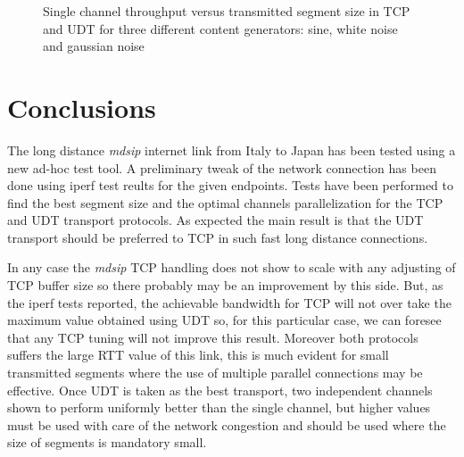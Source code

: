 \documentclass[10pt,a4paper]{article}
\begin{document}
\begin{figure}[ht]
\centerline{
}
\caption[]
{ Single channel throughput versus transmitted segment size in TCP and UDT for three different content generators: sine, white noise and gaussian noise }
\label{fig:content}
\end{figure}



\section{Conclusions}

The long distance \emph{mdsip} internet link from Italy to Japan has been tested using a new ad-hoc test tool.
A preliminary tweak of the network connection has been done using iperf test reults for the given endpoints.
Tests have been performed to find the best segment size and the optimal channels parallelization for the TCP and UDT transport protocols.
As expected the main result is that the UDT transport should be preferred to TCP in such fast long distance connections.

In any case the \emph{mdsip} TCP handling does not show to scale with any adjusting of TCP buffer size so there probably may be an improvement by this side.
But, as the iperf tests reported, the achievable bandwidth for TCP will not over take the maximum value obtained using UDT so, for this particular case, we can foresee that any TCP tuning will not improve this result.
Moreover both protocols suffers the large RTT value of this link, this is much evident for small transmitted segments where the use of multiple parallel connections may be effective.
Once UDT is taken as the best transport, two independent channels shown to perform uniformly better than the single channel, but higher values must be used with care of the network congestion and should be used where the size of segments is mandatory small.
\end{document}

